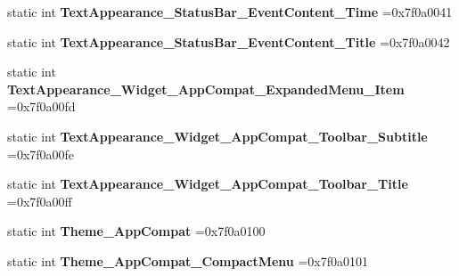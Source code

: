 \begin{DoxyCompactItemize}
static int {\bfseries Text\+Appearance\+\_\+\+Status\+Bar\+\_\+\+Event\+Content\+\_\+\+Time} =0x7f0a0041
\item 
\mbox{\label{classandroid_1_1support_1_1graphics_1_1drawable_1_1animated_1_1R_1_1style_a98bfa3a4d0732a4cd26143ecd62ced41}} 
static int {\bfseries Text\+Appearance\+\_\+\+Status\+Bar\+\_\+\+Event\+Content\+\_\+\+Title} =0x7f0a0042
\item 
\mbox{\label{classandroid_1_1support_1_1graphics_1_1drawable_1_1animated_1_1R_1_1style_aa262559b28332f9c9f1457019ebf7993}} 
static int {\bfseries Text\+Appearance\+\_\+\+Widget\+\_\+\+App\+Compat\+\_\+\+Expanded\+Menu\+\_\+\+Item} =0x7f0a00fd
\item 
\mbox{\label{classandroid_1_1support_1_1graphics_1_1drawable_1_1animated_1_1R_1_1style_a16ff93eb513988f09a614ac0bd915f8c}} 
static int {\bfseries Text\+Appearance\+\_\+\+Widget\+\_\+\+App\+Compat\+\_\+\+Toolbar\+\_\+\+Subtitle} =0x7f0a00fe
\item 
\mbox{\label{classandroid_1_1support_1_1graphics_1_1drawable_1_1animated_1_1R_1_1style_a87e8b29bed4cf82f519e1c323fcf6871}} 
static int {\bfseries Text\+Appearance\+\_\+\+Widget\+\_\+\+App\+Compat\+\_\+\+Toolbar\+\_\+\+Title} =0x7f0a00ff
\item 
\mbox{\label{classandroid_1_1support_1_1graphics_1_1drawable_1_1animated_1_1R_1_1style_a56cb42f7c933d2fc05492d04e15f33c4}} 
static int {\bfseries Theme\+\_\+\+App\+Compat} =0x7f0a0100
\item 
\mbox{\label{classandroid_1_1support_1_1graphics_1_1drawable_1_1animated_1_1R_1_1style_a83329793b4141740b126c910d6d3feb5}} 
static int {\bfseries Theme\+\_\+\+App\+Compat\+\_\+\+Compact\+Menu} =0x7f0a0101
\item 
\mbox{\label{classandroid_1_1support_1_1graphics_1_1drawable_1_1animated_1_1R_1_1style_aebc26498b6ba6f7257cde46ae817267a}} 

\end{DoxyCompactItemize}
